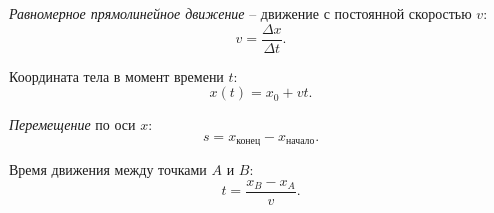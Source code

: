 \documentclass[12 pt, a4paper]{article}
\begin{document}
\textit{Равномерное прямолинейное движение} – движение с постоянной скоростью \(v\):
\[
v = \dfrac{\Delta x}{\Delta t}.
\]

Координата тела в момент времени \(t\):
\[
x(t) = x_0 + vt.
\]

\textit{Перемещение} по оси \(x\):
\[
s = x_{\text{конец}} - x_{\text{начало}}.
\]

Время движения между точками \(A\) и \(B\):
\[
t = \frac{x_B - x_A}{v}.
\]
\end{document}
